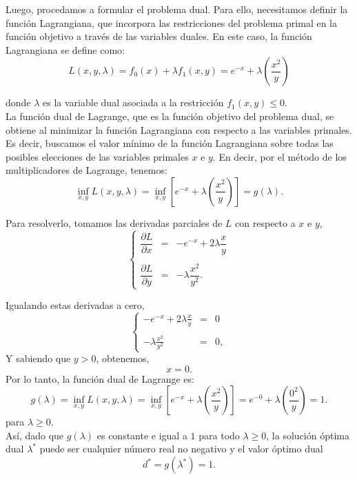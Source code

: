 \begin{enumerate}
\begin{enumerate}[\bfseries (a)]
	    Luego, procedamos a formular el problema dual. Para ello, necesitamos definir la función Lagrangiana, que incorpora las restricciones del problema primal en la función objetivo a través de las variables duales. En este caso, la función Lagrangiana se define como:
	    $$
	    L(x,y,\lambda) = f_0(x) + \lambda f_1(x,y) = e^{-x} + \lambda \left(\frac{x^2}{y}\right)
	    $$

	    donde $\lambda$ es la variable dual asociada a la restricción $f_1(x,y) \leq 0$.\\

	    La función dual de Lagrange, que es la función objetivo del problema dual, se obtiene al minimizar la función Lagrangiana con respecto a las variables primales. Es decir, buscamos el valor mínimo de la función Lagrangiana sobre todas las posibles elecciones de las variables primales $x$ e $y$. En decir, por el método de los multiplicadores de Lagrange, tenemos:
	    $$
	     \inf_{x,y} L(x,y,\lambda) = \inf_{x,y} \left[e^{-x} + \lambda \left(\frac{x^2}{y}\right)\right]=g(\lambda).
	    $$

	    Para resolverlo, tomamos las derivadas parciales de $L$ con respecto a $x$ e $y$, 
	    $$
	    \left\{
		\begin{array}{rcl}
		    \dfrac{\partial L}{\partial x} &=& -e^{-x} + 2\lambda \dfrac{x}{y}\\\\
		    \dfrac{\partial L}{\partial y} &=& -\lambda \dfrac{x^2}{y^2}.
		\end{array}
	    \right.
	    $$

	    Igualando estas derivadas a cero,
	    $$
	    \left\{
		\begin{array}{rcl}
		    -e^{-x} + 2\lambda \frac{x}{y} &=& 0\\\\
		    -\lambda \frac{x^2}{y^2} &=& 0,
		\end{array}
	    \right.
	    $$
	    Y sabiendo que $y > 0$, obtenemos, 
	    $$x = 0.$$
	    Por lo tanto, la función dual de Lagrange es:
	    $$
	    g(\lambda) = \inf_{x,y} L(x,y,\lambda) = \inf_{x,y} \left[e^{-x} + \lambda \left(\frac{x^2}{y}\right)\right] = e^{-0} + \lambda \left(\frac{0^2}{y}\right) = 1.
	    $$
	    para $\lambda \geq 0$.\\

	    Así, dado que $g(\lambda)$ es constante e igual a $1$ para todo $\lambda \geq 0$, la solución óptima dual $\lambda^*$ puede ser cualquier número real no negativo y el valor óptimo dual 
	    $$d^* = g(\lambda^*) = 1.$$


\end{enumerate}
\end{enumerate}
